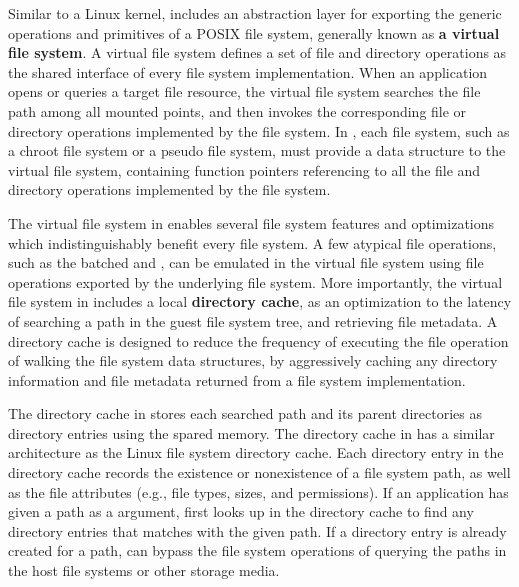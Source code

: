 Similar to a Linux kernel, \thelibos{} includes an abstraction layer for exporting the generic operations and primitives of a POSIX file system,
generally known as {\bf a virtual file system}.
A virtual file system defines a set of file and directory operations as the shared interface of every file system implementation.
When an application opens or queries a target file resource,
the virtual file system
searches the file path among all mounted points,
and then invokes the corresponding file or directory operations implemented by the file system.
In \thelibos{}, each file system, such as a chroot file system
or a pseudo file system,
must provide a data structure to the virtual file system, containing function pointers
referencing to all the file and directory operations  
implemented by the file system.








The virtual file system in \thelibos{} enables several file system features
and optimizations
which indistinguishably benefit every file system.
A few atypical file operations, such as the batched  and ,
can be emulated in the virtual file system
using file operations exported by the underlying file system.
More importantly, 
the virtual file system in \thelibos{} 
includes a local {\bf directory cache},
as an optimization to the latency of searching a path in the guest file system tree,
and retrieving file metadata.
A directory cache
is designed to reduce the frequency
of executing the file operation of walking the file system data structures,
by aggressively caching any directory information
and file metadata
returned from a file system implementation.


The directory cache in \thelibos{} stores each searched path and its parent directories as directory entries
using the spared \picoproc{} memory.
The directory cache in \thelibos{} has a similar architecture
as the Linux file system directory cache.
Each directory entry in the directory cache records the existence or nonexistence of a file system path,
as well as the file attributes
(e.g., file types, sizes, and permissions).
If an application has given a path as a \linuxapi{} argument,
\thelibos{} first looks up
in the directory cache to find any directory entries
that matches with the given path.
If a directory entry is already created for a path, \thelibos{} can bypass the file system operations of querying the paths
in the host file systems or other storage media.


